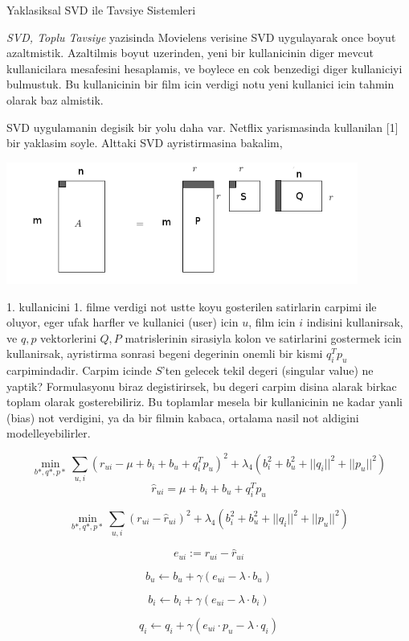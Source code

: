 \documentclass[12pt,fleqn]{article}\usepackage{../common}
\begin{document}
Yaklasiksal SVD ile Tavsiye Sistemleri

{\em SVD, Toplu Tavsiye} yazisinda Movielens verisine SVD uygulayarak once
boyut azaltmistik. Azaltilmis boyut uzerinden, yeni bir kullanicinin diger
mevcut kullanicilara mesafesini hesaplamis, ve boylece en cok benzedigi
diger kullaniciyi bulmustuk. Bu kullanicinin bir film icin verdigi notu yeni
kullanici icin tahmin olarak baz almistik. 

SVD uygulamanin degisik bir yolu daha var. Netflix yarismasinda kullanilan
[1] bir yaklasim soyle. Alttaki SVD ayristirmasina bakalim, 

\includegraphics[height=4cm]{svdapprox_1.png}

1. kullanicini 1. filme verdigi not ustte koyu gosterilen satirlarin
carpimi ile oluyor, eger ufak harfler ve kullanici (user) icin $u$, film
icin $i$ indisini kullanirsak, ve $q,p$ vektorlerini $Q,P$ matrislerinin
sirasiyla kolon ve satirlarini gostermek icin kullanirsak, ayristirma
sonrasi begeni degerinin onemli bir kismi $q_i^Tp_u$ carpimindadir. Carpim
icinde $S$'ten gelecek tekil degeri (singular value) ne yaptik?
Formulasyonu biraz degistirirsek, bu degeri carpim disina alarak birkac
toplam olarak gosterebiliriz. Bu toplamlar mesela bir kullanicinin ne kadar
yanli (bias) not verdigini, ya da bir filmin kabaca, ortalama nasil not
aldigini modelleyebilirler.



$$
\min_{b*,q*,p*} \sum_{u,i} (r_{ui} - \mu + b_i + b_u + q_i^Tp_u)^2 + 
\lambda_4 (b_i^2 + b_u^2 + ||q_i||^2 + ||p_u||^2)
$$
$$
\hat{r}_{ui} = \mu + b_i + b_u + q_i^Tp_u
$$

$$
\min_{b*,q*,p*} \sum_{u,i} (r_{ui} - \hat{r}_{ui})^2 + 
\lambda_4 (b_i^2 + b_u^2 + ||q_i||^2 + ||p_u||^2)
$$

$$ e_{ui} := r_{ui} - \hat{r}_{ui} $$

$$
b_u \leftarrow b_u + \gamma (e_{ui} - \lambda \cdot b_u)
$$

$$
b_i \leftarrow b_i + \gamma (e_{ui} - \lambda \cdot b_i)
$$

$$
q_i \leftarrow q_i + \gamma (e_{ui}\cdot p_u - \lambda \cdot q_i)
$$
\end{document}
